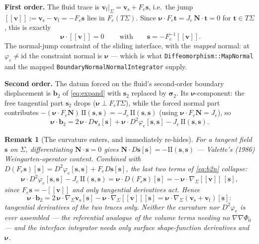 \documentclass[11pt]{article}
\newtheorem{remark}{Remark}
\newcommand{\bnu}{\bm{\nu}}
\newcommand{\bN}{\mathbf{N}}
\newcommand{\bs}{\mathbf{s}}
\newcommand{\bv}{\mathbf{v}}
\newcommand{\jump}[1]{[\![#1]\!]}
\begin{document}
\textbf{First order.} The fluid trace is
$\bv_{\mathrm{f}}|_\Sigma = \bv_{\mathrm{s}} + F_e\bs$, i.e.\ the jump
$\jump{\bv} := \bv_{\mathrm{s}} - \bv_{\mathrm{f}} = -F_e\bs$ lies in
$F_e(T\Sigma)$. Since $\bnu\cdot F_e\mathbf{t} = J_e\,\bN\cdot\mathbf{t}
= 0$ for $\mathbf{t}\in T\Sigma$, this is exactly
\begin{equation}
  \boxed{\ \bnu\cdot\jump{\bv} = 0 \ }
  \qquad\text{with}\qquad
  \bs = -F_e^{-1}\jump{\bv} .
  \label{eq:constraint}
\end{equation}
The normal-jump constraint of the sliding interface, with the
\emph{mapped} normal: at $\varphi_e \neq \mathrm{id}$ the constraint
normal is $\bnu$ --- which is what \texttt{Diffeomorphism::MapNormal}
and the mapped \texttt{BoundaryNormalNormalIntegrator} supply.

\textbf{Second order.} The datum forced on the fluid's second-order
boundary displacement is $\mathbf{b}_2$ of \eqref{eq:expand} with
$\bs_2$ replaced by $\bm{\sigma}_2$. Its $\bnu$-component: the free
tangential part $\bs_2$ drops ($\bnu \perp F_e T\Sigma$), while the
forced normal part contributes $-(\bnu\cdot F_e\bN)\,\mathrm{II}(\bs,\bs) =
-J_e\,\mathrm{II}(\bs,\bs)$ (using $\bnu\cdot F_e\bN = J_e$), so
\begin{equation}
  \bnu\cdot\mathbf{b}_2
  = 2\,\bnu\cdot D\bv_{\mathrm{s}}[\bs]
  + \bnu\cdot D^2\varphi_e[\bs,\bs]
  - J_e\,\mathrm{II}(\bs,\bs).
  \label{eq:b2n}
\end{equation}

\begin{remark}[The curvature enters, and immediately re-hides]
\label{rem:wein}
For a tangent field $\bs$ on $\Sigma$, differentiating
$\bN\cdot\bs = 0$ gives $\bN\cdot D\bs[\bs] = -\mathrm{II}(\bs,\bs)$
--- Valette's (1986) Weingarten-operator content. Combined with
$D(F_e\bs)[\bs] = D^2\varphi_e[\bs,\bs] + F_e D\bs[\bs]$, the last two
terms of \eqref{eq:b2n} collapse:
\begin{equation}
  \bnu\cdot D^2\varphi_e[\bs,\bs] - J_e\,\mathrm{II}(\bs,\bs)
  = \bnu\cdot D(F_e\bs)[\bs]
  = -\,\bnu\cdot \nabla_\Sigma\jump{\bv}\,[\bs],
  \label{eq:collapse}
\end{equation}
since $F_e\bs = -\jump{\bv}$ and only tangential derivatives act.
Hence
\begin{equation}
  \bnu\cdot\mathbf{b}_2
  = 2\,\bnu\cdot \nabla_\Sigma\bv_{\mathrm{s}}[\bs]
  - \bnu\cdot \nabla_\Sigma\jump{\bv}[\bs]
  = \bnu\cdot \nabla_\Sigma(\bv_{\mathrm{s}} + \bv_{\mathrm{f}})[\bs]:
  \label{eq:b2clean}
\end{equation}
tangential derivatives of the two \emph{traces} only. Neither the
curvature nor $D^2\varphi_e$ is ever assembled --- the referential
analogue of the volume terms needing no $\nabla\nabla\Phi_0$ --- and
the interface integrator needs only surface shape-function derivatives
and $\bnu$.
\end{remark}
\end{document}
